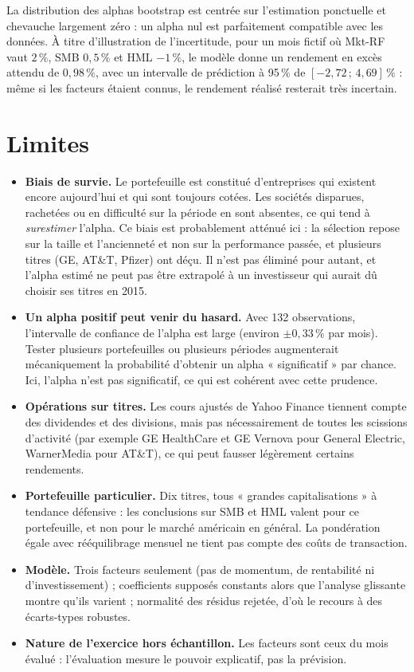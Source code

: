 \documentclass[11pt,a4paper]{article}
\begin{document}
La distribution des alphas bootstrap est centrée sur l'estimation ponctuelle et chevauche largement zéro : un alpha nul est parfaitement compatible avec les données. À titre d'illustration de l'incertitude, pour un mois fictif où Mkt-RF vaut $2\,\%$, SMB $0{,}5\,\%$ et HML $-1\,\%$, le modèle donne un rendement en excès attendu de $0{,}98\,\%$, avec un intervalle de prédiction à 95\,\% de $[-2{,}72\,;\,4{,}69]\,\%$ : même si les facteurs étaient connus, le rendement réalisé resterait très incertain.

\section{Limites}

\begin{itemize}
  \item \textbf{Biais de survie.} Le portefeuille est constitué d'entreprises qui existent encore aujourd'hui et qui sont toujours cotées. Les sociétés disparues, rachetées ou en difficulté sur la période en sont absentes, ce qui tend à \emph{surestimer} l'alpha. Ce biais est probablement atténué ici : la sélection repose sur la taille et l'ancienneté et non sur la performance passée, et plusieurs titres (GE, AT\&T, Pfizer) ont déçu. Il n'est pas éliminé pour autant, et l'alpha estimé ne peut pas être extrapolé à un investisseur qui aurait dû choisir ses titres en 2015.
  \item \textbf{Un alpha positif peut venir du hasard.} Avec 132 observations, l'intervalle de confiance de l'alpha est large (environ $\pm 0{,}33\,\%$ par mois). Tester plusieurs portefeuilles ou plusieurs périodes augmenterait mécaniquement la probabilité d'obtenir un alpha « significatif » par chance. Ici, l'alpha n'est pas significatif, ce qui est cohérent avec cette prudence.
  \item \textbf{Opérations sur titres.} Les cours ajustés de Yahoo Finance tiennent compte des dividendes et des divisions, mais pas nécessairement de toutes les scissions d'activité (par exemple GE HealthCare et GE Vernova pour General Electric, WarnerMedia pour AT\&T), ce qui peut fausser légèrement certains rendements.
  \item \textbf{Portefeuille particulier.} Dix titres, tous « grandes capitalisations » à tendance défensive : les conclusions sur SMB et HML valent pour ce portefeuille, et non pour le marché américain en général. La pondération égale avec rééquilibrage mensuel ne tient pas compte des coûts de transaction.
  \item \textbf{Modèle.} Trois facteurs seulement (pas de momentum, de rentabilité ni d'investissement) ; coefficients supposés constants alors que l'analyse glissante montre qu'ils varient ; normalité des résidus rejetée, d'où le recours à des écarts-types robustes.
  \item \textbf{Nature de l'exercice hors échantillon.} Les facteurs sont ceux du mois évalué : l'évaluation mesure le pouvoir explicatif, pas la prévision.
\end{itemize}
\end{document}

